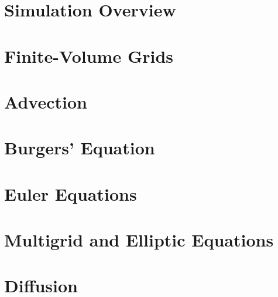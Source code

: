 \documentclass[11pt]{book}
\renewcommand{\chaptermark}[1]{%
\markboth{\chaptername
\ \thechapter.\ #1}{}}
\renewcommand{\sectionmark}[1]{\markright{\thesection---#1}}
\begin{document}
\clearpage

\pagestyle{headings}

\renewcommand{\chaptermark}[1]{%
\markboth{\chaptername
\ \thechapter.\ #1}{}}

\renewcommand{\sectionmark}[1]{\markright{\thesection---#1}}


\mainmatter


\chapter{Simulation Overview}



\chapter{Finite-Volume Grids}



\chapter{Advection}



\chapter{Burgers' Equation}



\chapter{Euler Equations}



\chapter{Multigrid and Elliptic Equations}



\chapter{Diffusion}
\end{document}
